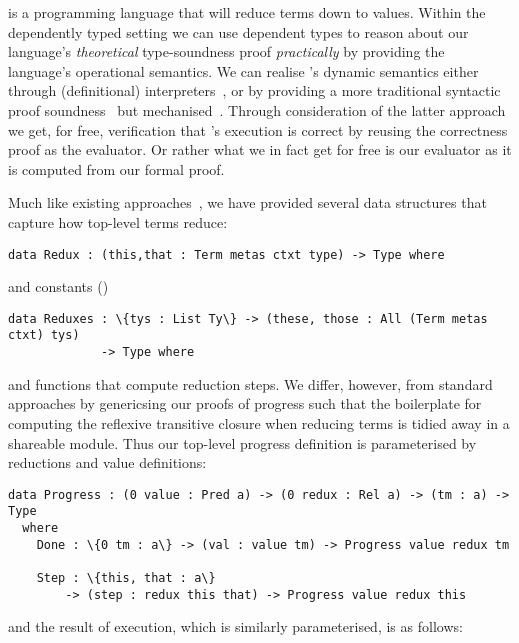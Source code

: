 
\Velo{} is a programming language that will reduce terms down to values.
Within the dependently typed setting we can use dependent types to reason about our language's \emph{theoretical} type-soundness proof \emph{practically} by providing the language's operational semantics.
We can realise \Velo{}'s dynamic semantics either through (definitional) interpreters~\cite{10.1145/3093333.3009866,Augustsson1999edt}, or by providing a more traditional syntactic proof soundness~\cite{DBLP:journals/iandc/WrightF94} but mechanised~\cite[Part 2: Properties]{plfa22.08}.
Through consideration of the latter approach we get, for free, verification that \Velo{}'s execution is correct by reusing the correctness proof as the evaluator.
Or rather what we in fact get for free is our evaluator as it is computed from our formal proof.

Much like existing approaches~\cite[Part 2: Properties]{plfa22.08}, we have provided several data structures that capture how top-level terms reduce:

\begin{Verbatim}
data Redux : (this,that : Term metas ctxt type) -> Type where
\end{Verbatim}

\noindent
and constants ()

\begin{Verbatim}
data Reduxes : \{tys : List Ty\} -> (these, those : All (Term metas ctxt) tys)
             -> Type where
\end{Verbatim}

\noindent
and functions that compute reduction steps.
We differ, however, from standard approaches by genericsing our proofs of progress such that the boilerplate for computing the reflexive transitive closure when reducing terms is tidied away in a shareable module.
Thus our top-level progress definition is parameterised by reductions and value definitions:

\begin{Verbatim}
data Progress : (0 value : Pred a) -> (0 redux : Rel a) -> (tm : a) -> Type
  where
    Done : \{0 tm : a\} -> (val : value tm) -> Progress value redux tm

    Step : \{this, that : a\}
        -> (step : redux this that) -> Progress value redux this
\end{Verbatim}

\noindent
and the result of execution, which is similarly parameterised, is as follows:

